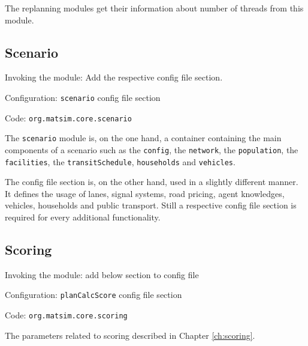 The replanning modules get their information about number of threads from this module.

\subsection{Scenario}
\label{sec:scenario}
\begin{compactitem}
\item Invoking the module: Add the respective config file section.
\item Configuration: \lstinline|scenario| config file section 
\item Code: \lstinline|org.matsim.core.scenario|
\end{compactitem}

The \lstinline|scenario| module is, on the one hand, a container containing the main components of a scenario such as the \lstinline|config|, the \lstinline|network|, the \lstinline|population|, the \lstinline|facilities|, the \lstinline|transitSchedule|, \lstinline|households| and \lstinline|vehicles|.

The config file section is, on the other hand, used in a slightly different manner. It defines the usage of lanes, signal systems, road pricing, agent knowledges, vehicles, households and public transport. Still a respective config file section is required for every additional functionality.

\subsection{Scoring}
\label{sec:scoring}
\begin{compactitem}
\item Invoking the module: add below section to config file
\item Configuration: \lstinline|planCalcScore| config file section
\item Code: \lstinline|org.matsim.core.scoring|
\end{compactitem}

The parameters related to scoring described in Chapter \ref{ch:scoring}.


